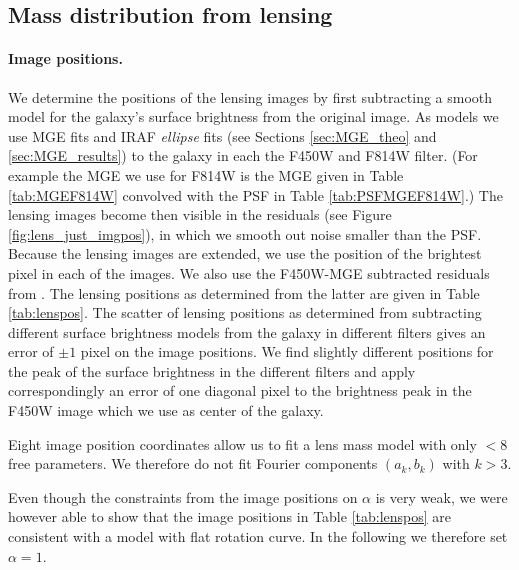 \subsection{Mass distribution from lensing} \label{sec:results_lensing}

\paragraph{Image positions.} We determine the positions of the lensing images by first subtracting a smooth model for the galaxy's surface brightness from the original image. As models we use MGE fits and IRAF \emph{ellipse} fits  (see Sections \ref{sec:MGE_theo} and \ref{sec:MGE_results})  to the galaxy in each the F450W and F814W filter. (For example the MGE we use for F814W is the MGE given in Table \ref{tab:MGEF814W} convolved with the PSF in Table \ref{tab:PSFMGEF814W}.) The lensing images become then visible in the residuals (see Figure \ref{fig:lens_just_imgpos}), in which we smooth out noise smaller than the PSF. Because the lensing images are extended, we use the position of the brightest pixel in each of the images. We also use the F450W-MGE subtracted residuals from \citet{SWELLSIII}. The lensing positions as determined from the latter are given in Table \ref{tab:lenspos}. The scatter of lensing positions as determined from subtracting different surface brightness models from the galaxy in different filters gives an error of $\pm 1$ pixel on the image positions. We find slightly different positions for the peak of the surface brightness in the different filters and apply correspondingly an error of one diagonal pixel to the brightness peak in the F450W image which we use as center of the galaxy.

Eight image position coordinates allow us to fit a lens mass model with only $<8$ free parameters. We therefore do not fit Fourier components $(a_k,b_k)$ with $k > 3$.

Even though the constraints from the image positions on $\alpha$ is very weak, we were however able to show that the image positions in Table \ref{tab:lenspos} are consistent with a model with flat rotation curve. In the following we therefore set $\alpha=1$.


